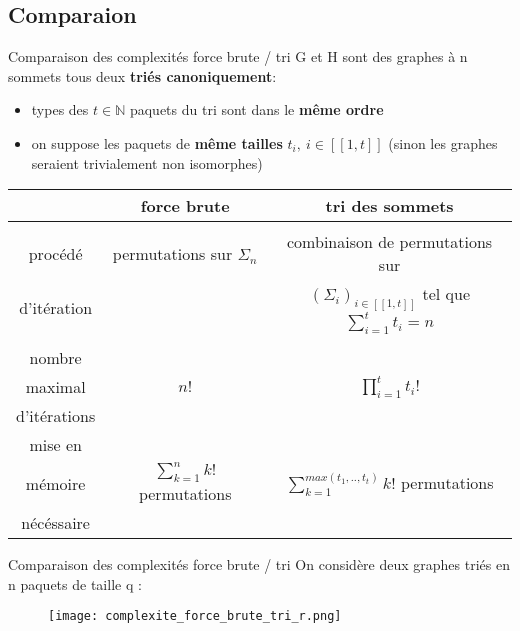 \subsection{Comparaion}
\begin{frame}{Comparaison des complexités force brute / tri}
    G et H sont des graphes à n sommets tous deux \textbf{triés canoniquement}:
    \begin{itemize}
        \item types des $t \in \mathbb{N}$ paquets du tri sont dans le \textbf{même ordre} 
        \item on suppose les paquets de \textbf{même tailles} $t_i,\ i \in [\![1,t]\!]$ (sinon les graphes seraient trivialement non isomorphes)
        \newline 
    \end{itemize} 
    \scriptsize
    \begin{center}
    \begin{tabular}{c|c|c}
        & force brute & tri des sommets \\
        \hline & & \\
        procédé & permutations sur $\Sigma_n$ & combinaison de permutations sur \\
        d'itération & & $(\Sigma_i)_{i \in [\![1,t]\!]}$ tel que $\sum_{i=1}^t t_i  = n$ \\ & & \\
        \hline
        nombre & & \\ maximal & $n!$ & $\prod_{i=1}^t t_i!$ \\ d'itérations & & \\
        \hline
        mise en & & \\ mémoire & $\sum_{k=1}^n k! $ permutations & $\sum_{k=1}^{max(t_1,..,t_t)} k! $ permutations \\ nécéssaire
    \end{tabular}
    \end{center}
\end{frame}

\begin{frame}{Comparaison des complexités force brute / tri}
    On considère deux graphes triés en n paquets de taille q :
    \begin{figure}[!htb]
        \texttt{[image: complexite\_force\_brute\_tri\_r.png]}
    \end{figure}
\end{frame}
